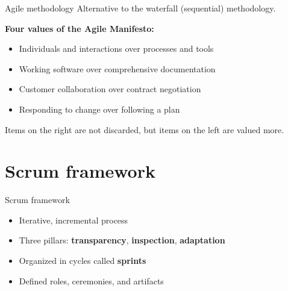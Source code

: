\begin{frame}{Agile methodology}
  Alternative to the waterfall (sequential) methodology.

  \vspace{0.3cm}
  \textbf{Four values of the Agile Manifesto:}
  \begin{itemize}
    \item Individuals and interactions over processes and tools
    \item Working software over comprehensive documentation
    \item Customer collaboration over contract negotiation
    \item Responding to change over following a plan
  \end{itemize}

  \vspace{0.3cm}
  Items on the right are not discarded, but items on the left are valued more.
\end{frame}

\section{Scrum framework}

\begin{frame}{Scrum framework}
  \begin{itemize}
    \item Iterative, incremental process
    \item Three pillars: \textbf{transparency}, \textbf{inspection}, \textbf{adaptation}
    \item Organized in cycles called \textbf{sprints}
    \item Defined roles, ceremonies, and artifacts
  \end{itemize}
\end{frame}

